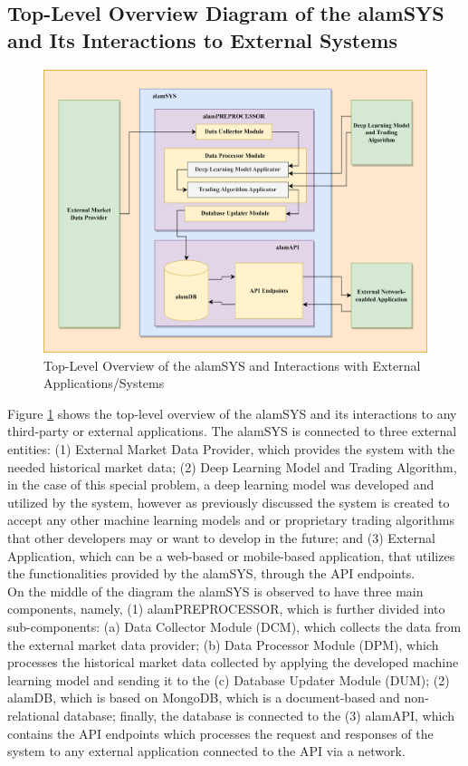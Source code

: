 \subsection{Top-Level Overview Diagram of the alamSYS and Its Interactions to External Systems}
\label{subsec:top_level_overview}

\begin{figure}[ht]
    \centering
    \includegraphics[height=0.45\textheight]{./assets/Chapter_3/SystemOverview.png}
    \caption{Top-Level Overview of the alamSYS and Interactions with External Applications/Systems}
    \label{fig:system_overview}
\end{figure}
\FloatBarrier

Figure \ref{fig:system_overview} shows the top-level overview of the 
alamSYS and its interactions to any third-party or external applications. 
The alamSYS is connected to three external 
entities: (1) External Market Data Provider, which provides the system with the 
needed historical market data; (2) Deep Learning Model and Trading Algorithm, 
in the case of this special problem, a deep learning model was developed and 
utilized by the system, however as previously discussed the system is 
created to accept any other machine learning models and or proprietary trading algorithms 
that other developers may or want to develop in the future; and 
(3) External Application, which can be a web-based or mobile-based application, that
utilizes the functionalities provided by the alamSYS, through the
API endpoints.
\hfill \\

On the middle of the diagram the alamSYS is observed to have three main components, 
namely, (1) alamPREPROCESSOR, which is further divided into sub-components: 
(a) Data Collector Module (DCM), which collects the data from the external market data provider; 
(b) Data Processor Module (DPM), which processes the historical market data collected by 
applying the developed machine learning model and sending it to the (c) Database Updater
Module (DUM); (2) alamDB, which is based on MongoDB, which is a document-based and non-relational 
database; finally, the database is connected to the (3) alamAPI, which contains the 
API endpoints which processes the request and responses of the system to any external 
application connected to the API via a network.